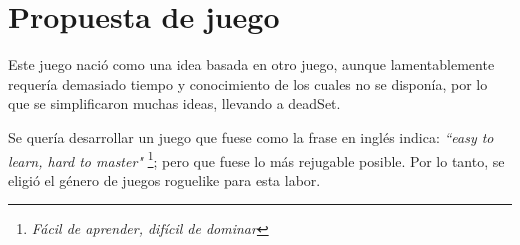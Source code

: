 \documentclass[12pt]{article}
\begin{document}
\tableofcontents
\newpage

\listoffigures
\newpage


\section{Propuesta de juego}

    Este juego nació como una idea basada en otro juego, aunque lamentablemente requería demasiado tiempo y conocimiento de los cuales no se disponía, por lo que se simplificaron muchas ideas, llevando a \textunderscore deadSet. 

    Se quería desarrollar un juego que fuese como la frase en inglés indica: \textit{“easy to learn, hard to master"} \footnote{\textit{Fácil de aprender, difícil de dominar}}; pero que fuese lo más rejugable posible. Por lo tanto, se eligió el género de juegos roguelike para esta labor. 

\end{document}

